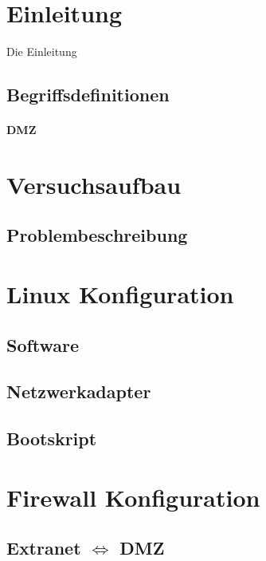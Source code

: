 \section{Einleitung}

Die Einleitung \cite{iptables}

\subsection{Begriffsdefinitionen}

\paragraph{DMZ}



\section{Versuchsaufbau}

\subsection{Problembeschreibung}



\section{Linux Konfiguration}

\subsection{Software}

\subsection{Netzwerkadapter}

\subsection{Bootskript}



\section{Firewall Konfiguration}

\subsection{Extranet $\Longleftrightarrow$ DMZ}

